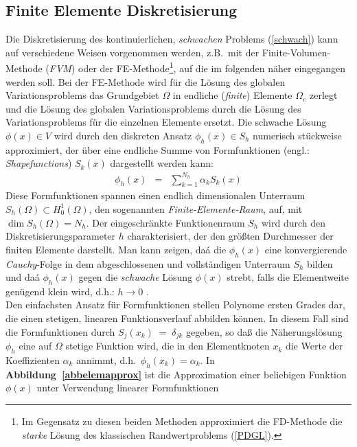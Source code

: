 \subsection{Finite Elemente Diskretisierung}
\label{diskretisierung}

Die Diskretisierung des kontinuierlichen, {\em schwachen} Problems
(\ref{schwach}) kann
auf verschiedene Weisen vorgenommen werden, z.B.\ mit der
Finite-Volumen-Methode ({\em FVM}) oder der FE-Methode\footnote{Im Gegensatz
zu diesen beiden Methoden approximiert die FD-Methode die {\em starke} Lösung
des klassischen Randwertproblems (\ref{PDGL}).}, auf die im folgenden
näher eingegangen werden soll. Bei der FE-Methode wird für die Lösung
des globalen Variationsproblems das Grundgebiet $\Omega$ in endliche
({\em finite}) Elemente $\Omega_{e}$ zerlegt und die Lösung des globalen
Variationsproblems durch die Lösung des Variationsproblems für die
einzelnen Elemente ersetzt. Die schwache Lösung $\phi(x) \in V$ wird durch
den diskreten Ansatz $\phi_{h}(x) \in S_{h}$ numerisch stückweise
approximiert, der über eine endliche Summe von Formfunktionen
(engl.: {\em Shapefunctions}) $S_{k}(x)$ dargestellt werden kann:
\begin{eqnarray}
\label{Sentw}
 \phi_{h}(x) & = & \sum_{k=1}^{N_{h}} \alpha_{k} S_{k}(x)
\end{eqnarray}
Diese Formfunktionen spannen einen endlich dimensionalen Unterraum
$S_{h}(\Omega) \subset H_{0}^{1}(\Omega)$, den sogenannten
{\em Finite-Elemente-Raum}, auf, mit $\dim S_{h}(\Omega) = N_{h}$.
Der eingeschränkte Funktionenraum $S_{h}$ wird durch den
Diskretisierungsparameter $h$ charakterisiert, der den größten Durchmesser
der finiten Elemente darstellt. Man kann zeigen, daá die $\phi_{h}(x)$ eine
konvergierende {\sl Cauchy}\/-Folge in dem abgeschlossenen und vollständigen
Unterraum $S_{h}$ bilden und daá $\phi_{h}(x)$ gegen die {\em schwache}
Lösung $\phi(x)$ strebt, falls die Elementweite genügend klein wird,
d.h.: $h \rightarrow 0$ \cite{Cia78}.\\
%
Den einfachsten Ansatz für Formfunktionen stellen Polynome ersten Grades
dar, die einen stetigen, linearen Funktionsverlauf abbilden können. In diesem
Fall sind die Formfunktionen durch $S_{j}(x_{k}) \; = \; \delta_{jk}$
gegeben, so daß die Näherungslösung $\phi_{h}$ eine %
auf $\Omega$ stetige Funktion wird, die in den Elementknoten $x_{k}$ die
Werte der Koeffizienten $\alpha_{k}$ annimmt, d.h.\
$\phi_{h}(x_{k})=\alpha_{k}$.
In {\bf Abbildung~\ref{abbelemapprox}} ist die Approximation einer
beliebigen Funktion $\phi(x)$ unter Verwendung linearer Formfunktionen
